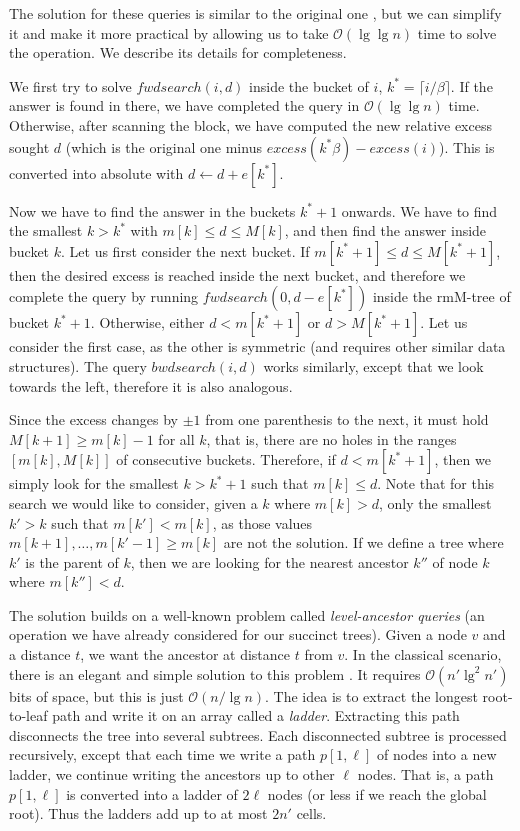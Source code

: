 \documentclass[11pt]{article}
\renewcommand{\log}{\lg}
\newcommand{\0}{\mathit{0}}
\newcommand{\1}{\mathit{1}}
\newcommand{\excess}{\mathit{excess}}
\newcommand{\fwdsearch}{\mathit{fwdsearch}}
\newcommand{\bwdsearch}{\mathit{bwdsearch}}
\newcommand{\Oh}[1]{\mathcal{O}\!\left(#1\right)}
\begin{document}
The solution for these queries is similar to the original one \cite{NS14},
but we can simplify it and make it more practical by allowing us to take
$\Oh{\log\log n}$ time to solve the operation. 
We describe its details for completeness.

We first try to solve $\fwdsearch(i,d)$ inside the bucket of $i$, 
$k^*=\lceil i/\beta \rceil$. If the answer is found in there, we have completed
the query in $\Oh{\log\log n}$ time. Otherwise, after scanning the block, we
have computed the new relative excess sought $d$ (which is the original one
minus $\excess(k^*\beta)-\excess(i)$). This is converted into absolute with
$d \leftarrow d + e[k^*]$. 

Now we have to find the answer in the buckets $k^*+1$ onwards. We have to find
the smallest $k>k^*$ with $m[k] \le d \le M[k]$, and then find the answer inside
bucket $k$. Let us first consider the next bucket. If 
$m[k^*+1] \le d \le M[k^*+1]$, then the desired excess is reached inside the 
next bucket, and therefore we complete the query by running 
$\fwdsearch(0,d-e[k^*])$ inside the rmM-tree of bucket $k^*+1$.
Otherwise, either $d < m[k^*+1]$ or $d > M[k^*+1]$. Let us consider the first
case, as the other is symmetric (and requires other similar data structures).
The query $\bwdsearch(i,d)$ works
similarly, except that we look towards the left, therefore it is also analogous.

Since the excess changes by $\pm 1$ from one parenthesis to the next, 
it must hold $M[k+1] \ge m[k]-1$ for all
$k$, that is, there are no holes in the ranges $[m[k],M[k]]$ of consecutive
buckets. Therefore, if $d < m[k^*+1]$, then we simply look for the smallest
$k>k^*+1$ such that $m[k] \le d$.
Note that for this search we would like to consider, given a $k$ where
$m[k] > d$, only the smallest $k' > k$ such that $m[k'] < m[k]$, as those
values $m[k+1],\ldots,m[k'-1] \ge m[k]$ are not the solution. If we define
a tree where $k'$ is the parent of $k$, then we are looking for the nearest
ancestor $k''$ of node $k$ where $m[k''] < d$.

The solution builds on a well-known problem called {\em level-ancestor queries}
(an operation we have already considered for our succinct trees). Given a node
$v$ and a distance $t$, we want the ancestor at distance $t$ from $v$. In the
classical scenario, there is an elegant and simple solution to this problem
\cite{BF04}.
It requires $\Oh{n'\log^2 n'}$ bits of space, but this is just $\Oh{n/\log n}$.
The idea is to extract the longest root-to-leaf path and write it on an array
called a {\em ladder}. Extracting this path disconnects the tree into several 
subtrees. Each disconnected subtree is processed recursively, except that each 
time we write a path $p[1,\ell]$ of nodes into a new ladder, we continue 
writing the ancestors up to other $\ell$ nodes. That is, a path $p[1,\ell]$ 
is converted into a ladder of $2\ell$ nodes (or less if we reach the global
root). Thus the ladders add up to at most $2n'$ cells.
\end{document}
